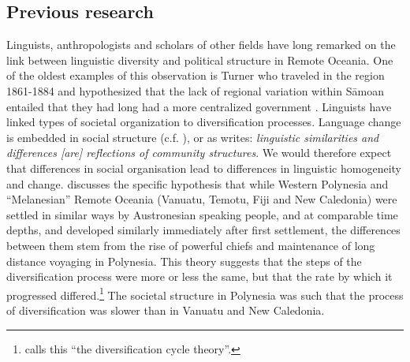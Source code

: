 \documentclass[a4paper,10pt]{article} %
\begin{document}
\subsection{Previous research}
\label{nonlingfactors}
Linguists, anthropologists and scholars of other fields have long remarked on the link between linguistic diversity and political structure in Remote Oceania. One of the oldest examples of this observation is Turner who traveled in the region 1861-1884 and hypothesized that the lack of regional variation within S\={a}moan entailed that they had long had a more centralized government \citep[172]{turner1884}. Linguists have linked types of societal organization to diversification processes. Language change is embedded in social structure (c.f. \citep{WLH1968}), or as \citet[124]{grace_1992_aberrant} writes: \emph{linguistic similarities and differences [are] reflections of community structures}. We would therefore expect that differences in social organisation lead to differences in linguistic homogeneity and change. \citet{pawley81, pawley2007} discusses the specific hypothesis that while Western Polynesia and ``Melanesian'' Remote Oceania (Vanuatu, Temotu, Fiji and New Caledonia) were settled in similar ways by Austronesian speaking people, and at comparable time depths, and developed similarly immediately after first settlement, the differences between them stem from the rise of powerful chiefs and maintenance of long distance voyaging in Polynesia. This theory suggests that the steps of the diversification process were more or less the same, but that the rate by which it progressed differed.\footnote{\citet{lynch1981melanesian} calls this ``the diversification cycle theory''.} The societal structure in Polynesia was such that the process of diversification was slower than in Vanuatu and New Caledonia.



\end{document}
